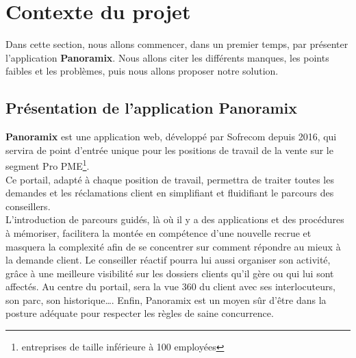 \section[Contexte du projet]{Contexte du projet}
Dans cette section, nous allons commencer, dans un premier temps, par présenter l’application \textbf{Panoramix}. Nous allons citer les différents manques, les points faibles et les problèmes, puis nous allons proposer notre solution.
\subsection[Présentation de l’application Panoramix]{Présentation de l’application Panoramix}
\textbf{Panoramix} \cite{panoramix} est une application web, développé par Sofrecom depuis 2016, qui servira de point d'entrée unique pour les positions de travail de la vente sur le segment Pro PME\footnote{entreprises de taille inférieure à 100 employées}.\\
Ce portail, adapté à chaque position de travail, permettra de traiter toutes les demandes et les réclamations client en simplifiant et fluidifiant le parcours des conseillers.\\
L’introduction de parcours guidés, là où il y a des applications et des procédures à mémoriser, facilitera la montée en compétence d’une nouvelle recrue et masquera la complexité afin de se concentrer sur comment répondre au mieux à la demande client. Le conseiller réactif pourra lui aussi organiser son activité, grâce à une meilleure visibilité sur les dossiers clients qu’il gère ou qui lui sont affectés. Au centre du portail, sera la vue 360 du client avec ses interlocuteurs, son parc, son historique…. 
Enfin, Panoramix est un moyen sûr d’être dans la posture adéquate pour respecter les règles de saine concurrence.
